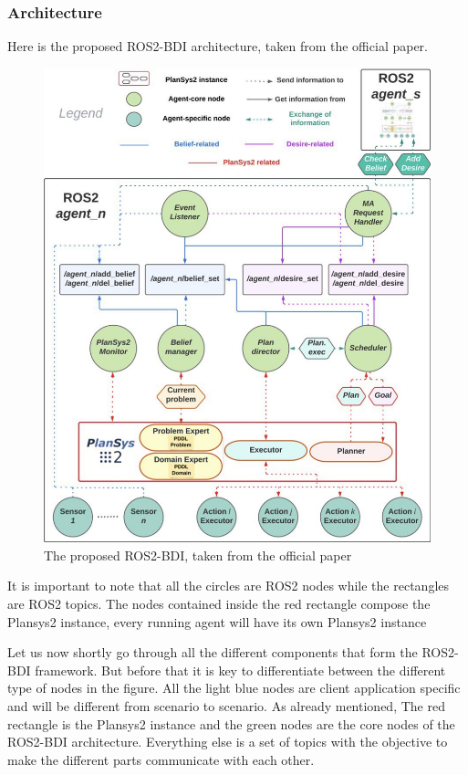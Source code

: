 \subsubsection{Architecture} Here is the proposed ROS2-BDI architecture, taken from the official paper.
\begin{figure}[H]
\centering
\includegraphics[scale=0.4]{images/offline_architecture.jpg}
\caption{The proposed ROS2-BDI, taken from the official paper}
\end{figure}
It is important to note that all the circles are ROS2 nodes while the rectangles are ROS2 topics. The nodes contained inside the red rectangle compose the Plansys2 instance, every running agent will have its own Plansys2 instance
\par
Let us now shortly go through all the different components that form the ROS2-BDI framework. But before that it is key to differentiate between the different type of nodes in the figure. All the light blue nodes are client application specific and will be different from scenario to scenario. As already mentioned, The red rectangle is the Plansys2 instance and the green nodes are the core nodes of the ROS2-BDI architecture. Everything else is a set of topics with the objective to make the different parts communicate with each other.

